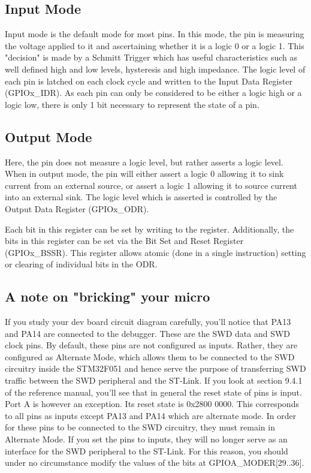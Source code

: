 \subsection{Input Mode}
Input mode is the default mode for most pins. In this mode, the pin is measuring the voltage applied to it and ascertaining whether it is a logic 0 or a logic 1. This "decision" is made by a Schmitt Trigger which has useful characteristics such as well defined high and low levels, hysteresis and high impedance. The logic level of each pin is latched on each clock cycle and written to the Input Data Register (GPIOx\_IDR). As each pin can only be considered to be either a logic high or a logic low, there is only 1 bit necessary to represent the state of a pin.

\subsection{Output Mode}
Here, the pin does not measure a logic level, but rather asserts a logic level. When in output mode, the pin will either assert a logic 0 allowing it to sink current from an external source, or assert a logic 1 allowing it to source current into an external sink. The logic level which is asserted is controlled by the Output Data Register (GPIOx\_ODR). 

Each bit in this register can be set by writing to the register. Additionally, the bits in this register can be set via the Bit Set and Reset Register (GPIOx\_BSSR). This register allows atomic (done in a single instruction) setting or clearing of individual bits in the ODR. 

\subsection{A note on "bricking" your micro}
If you study your dev board circuit diagram carefully, you'll notice that PA13 and PA14 are connected to the debugger. These are the SWD data and SWD clock pins. By default, these pins are not configured as inputs. Rather, they are configured as Alternate Mode, which allows them to be connected to the SWD circuitry inside the STM32F051 and hence serve the purpose of transferring SWD traffic between the SWD peripheral and the ST-Link. If you look at section 9.4.1 of the reference manual, you'll see that in general the reset state of pins is input. Port A is however an exception. Its reset state is 0x2800 0000. This corresponds to all pins as inputs except PA13 and PA14 which are alternate mode. In order for these pins to be connected to the SWD circuitry, they must remain in Alternate Mode. If you set the pins to inputs, they will no longer serve as an interface for the SWD peripheral to the ST-Link. For this reason, you should under no circumstance modify the values of the bits at GPIOA\_MODER[29..36]. 

